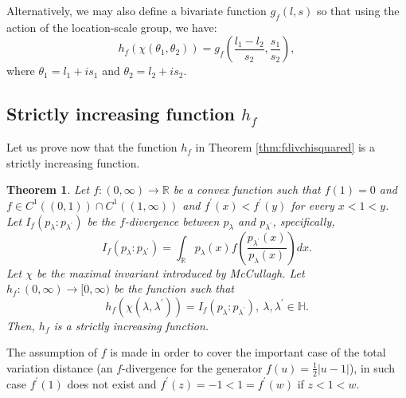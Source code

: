 \documentclass[journal]{IEEEtran}
\newtheorem{theorem}{Theorem}
\begin{document}
Alternatively, we may also define a bivariate function $g_f(l,s)$ so that using the action of the location-scale group, we have:
$$
h_f(\chi(\theta_1,\theta_2)) = g_f\left(\frac{l_1-l_2}{s_2},\frac{s_1}{s_2}\right),
$$
where $\theta_1=l_1+is_1$ and $\theta_2=l_2+is_2$. 



\subsection{Strictly increasing function $h_f$}

Let us prove now that the function $h_f$ in Theorem \ref{thm:fdivchisquared} is a strictly increasing function.


\begin{theorem}\label{thm:strict-increasing}
Let $f : (0, \infty) \to \mathbb R$ be a convex function such that $f(1) = 0$ and $f \in C^1 ((0,1)) \cap C^1((1, \infty))$ and $f^{\prime}(x) < f^{\prime}(y)$ for every $x < 1 < y$. 
Let $I_f (p_{\lambda} : p_{\lambda^{\prime}})$ be the $f$-divergence between $p_{\lambda}$ and $p_{\lambda^{\prime}}$, specifically, 
\[ I_f (p_{\lambda} : p_{\lambda^{\prime}}) = \int_{\mathbb R} p_{\lambda}(x) f\left( \frac{p_{\lambda^{\prime}}(x)}{p_{\lambda}(x)} \right)dx. \] 
Let $\chi$ be the maximal invariant introduced by McCullagh. 
Let $h_f  : (0, \infty) \to [0, \infty)$ be the function such that 
\[ h_f (\chi(\lambda, \lambda^{\prime})) = I_f (p_{\lambda} : p_{\lambda^{\prime}}), \ \lambda, \lambda^{\prime} \in \mathbb{H}. \]
Then, $h_f$ is a strictly increasing function. 
\end{theorem}

The assumption of $f$ is made in order to cover the important case of the total variation distance 
(an $f$-divergence for the generator $f(u)=\frac{1}{2}|u-1|$), in such case $f^{\prime}(1)$ does not exist and $f^{\prime}(z) = -1 <  1 = f^{\prime}(w)$ if $z < 1 < w$. 
\end{document}
